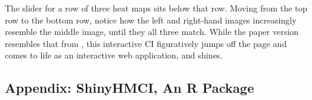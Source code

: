 \documentclass{article}
\begin{document}
The slider for a row of three heat maps sits below that row. Moving from the top row to the bottom row, notice how the left and right-hand images increasingly resemble the middle image, until they all three match. While the paper version resembles that from \cite{Cross2015}, this interactive CI figuratively jumps off the page and comes to life as an interactive web application, and shines.

  
\subsection{Appendix: ShinyHMCI, An R Package}


\end{document}
